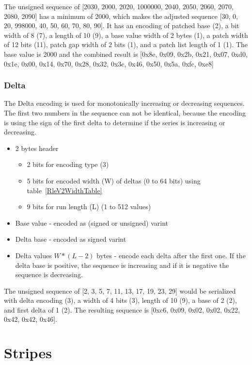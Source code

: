 \documentclass{article}
\begin{document}
The unsigned sequence of [2030, 2000, 2020, 1000000, 2040, 2050, 2060,
  2070, 2080, 2090] has a minimum of 2000, which makes the adjusted
sequence [30, 0, 20, 998000, 40, 50, 60, 70, 80, 90]. It has an
encoding of patched base (2), a bit width of 8 (7), a length of 10
(9), a base value width of 2 bytes (1), a patch width of 12 bits (11),
patch gap width of 2 bits (1), and a patch list length of 1 (1). The
base value is 2000 and the combined result is [0x8e, 0x09, 0x2b, 0x21,
  0x07, 0xd0, 0x1e, 0x00, 0x14, 0x70, 0x28, 0x32, 0x3c, 0x46, 0x50,
  0x5a, 0xfc, 0xe8]

\subsubsection{Delta}

The Delta encoding is used for monotonically increasing or decreasing
sequences. The first two numbers in the sequence can not be identical,
because the encoding is using the sign of the first delta to determine
if the series is increasing or decreasing.

\begin{itemize}
\item 2 bytes header
  \begin{itemize}
  \item 2 bits for encoding type (3)
  \item 5 bits for encoded width (W) of deltas (0 to 64 bits)
        using table~\ref{RleV2WidthTable}
  \item 9 bits for run length (L) (1 to 512 values)
  \end{itemize}
\item Base value - encoded as (signed or unsigned) varint
\item Delta base - encoded as signed varint
\item Delta values $W * (L - 2)$ bytes - encode each delta after the first
  one. If the delta base is positive, the sequence is increasing and if it is
  negative the sequence is decreasing.
\end{itemize}

The unsigned sequence of [2, 3, 5, 7, 11, 13, 17, 19, 23, 29] would be
serialized with delta encoding (3), a width of 4 bits (3), length of
10 (9), a base of 2 (2), and first delta of 1 (2). The resulting
sequence is [0xc6, 0x09, 0x02, 0x02, 0x22, 0x42, 0x42, 0x46].

\section{Stripes}
\end{document}
